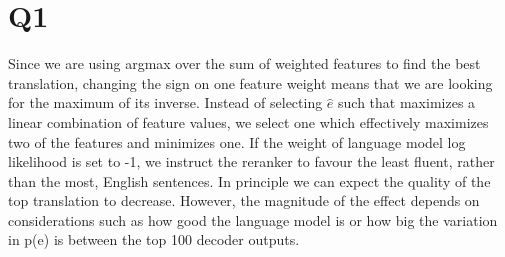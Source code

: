 \section*{Q1}

Since we are using argmax over the sum of weighted features to find the best translation, changing the sign on one feature weight means that we are looking for the maximum of its inverse. Instead of selecting $\hat{e}$ such that maximizes a linear combination of feature values, we select one which effectively maximizes two of the features and minimizes one. If the weight of language model log likelihood is set to -1, we instruct the reranker to favour the least fluent, rather than the most, English sentences. In principle we can expect the quality of the top translation to decrease. However, the magnitude of the effect depends on considerations such as how good the language model is or how big the variation in p(e) is between the top 100 decoder outputs.